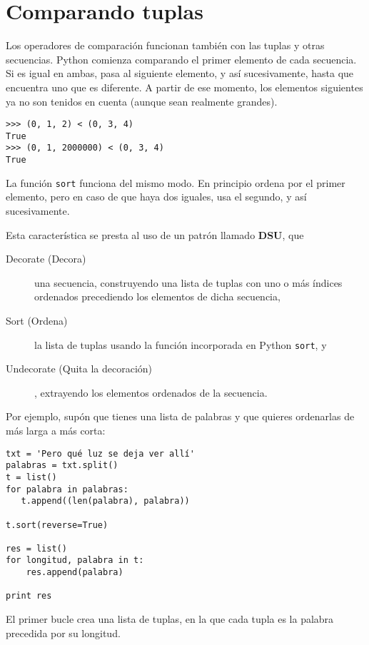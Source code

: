 \section{Comparando tuplas}


Los operadores de comparación funcionan también con las tuplas y otras secuencias.
Python comienza comparando el primer elemento de cada
secuencia. Si es igual en ambas, pasa al siguiente elemento,
y así sucesivamente, hasta que encuentra uno que es diferente. A partir de ese momento,
los elementos siguientes ya no son tenidos en cuenta (aunque sean realmente grandes).


\beforeverb
\begin{verbatim}
>>> (0, 1, 2) < (0, 3, 4)
True
>>> (0, 1, 2000000) < (0, 3, 4)
True
\end{verbatim}
\afterverb
%
La función {\tt sort} funciona del mismo modo. En principio
ordena por el primer elemento, pero en caso de que haya dos iguales,
usa el segundo, y así sucesivamente. 

Esta característica se presta al uso de un patrón llamado {\bf DSU}, que

\begin{description}

\item[Decorate (Decora)] una secuencia, construyendo una lista de tuplas
con uno o más índices ordenados precediendo los elementos de dicha secuencia,

\item[Sort (Ordena)] la lista de tuplas usando la función incorporada en Python {\tt sort}, y

\item[Undecorate (Quita la decoración)], extrayendo los elementos ordenados de la secuencia.

\end{description}

\label{DSU}

Por ejemplo, supón que tienes una lista de palabras y que quieres
ordenarlas de más larga a más corta:

\beforeverb
\begin{verbatim}
txt = 'Pero qué luz se deja ver allí'
palabras = txt.split()
t = list()
for palabra in palabras:
   t.append((len(palabra), palabra))

t.sort(reverse=True)

res = list()
for longitud, palabra in t:
    res.append(palabra)

print res
\end{verbatim}
\afterverb
%
El primer bucle crea una lista de tuplas, en la que cada
tupla es la palabra precedida por su longitud.


